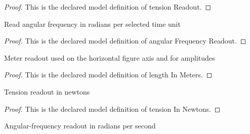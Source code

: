 \begin{proof}
  This is the declared model definition of tension Readout.
\end{proof}
\begin{definition}
  \label{def:physics:phyx-mini-0287:phyxminiproblems-problemphyxmini0287-angularfrequencyreadout}
  Read angular frequency in radians per selected time unit
\end{definition}
\begin{proof}
  This is the declared model definition of angular Frequency Readout.
\end{proof}
\begin{definition}
  \label{def:physics:phyx-mini-0287:phyxminiproblems-problemphyxmini0287-lengthinmeters}
  Meter readout used on the horizontal figure axis and for amplitudes
\end{definition}
\begin{proof}
  This is the declared model definition of length In Meters.
\end{proof}
\begin{definition}
  \label{def:physics:phyx-mini-0287:phyxminiproblems-problemphyxmini0287-tensioninnewtons}
  Tension readout in newtons
\end{definition}
\begin{proof}
  This is the declared model definition of tension In Newtons.
\end{proof}
\begin{definition}
  \label{def:physics:phyx-mini-0287:phyxminiproblems-problemphyxmini0287-angularfrequencyinradianspersecond}
  Angular-frequency readout in radians per second
\end{definition}
